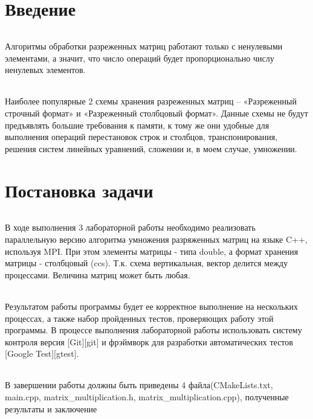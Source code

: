\documentclass[12pt,a4paper]{article}
\begin{document}
\part*{Введение}
\paragraph{}Алгоритмы обработки разреженных матриц работают только с ненулевыми элементами, а значит, что число операций будет пропорционально числу ненулевых элементов.
\paragraph{}Наиболее популярные 2 схемы хранения разреженных матриц – «Разреженный строчный формат» и «Разреженный столбцовый формат». Данные схемы не будут предъявлять большие требования к памяти, к тому же они удобные для выполнения операций перестановок строк и столбцов, транспонирования, решения систем линейных уравнений, сложении и, в моем случае, умножении.

\part*{Постановка задачи}
\paragraph{}В ходе выполнения 3 лабораторной работы необходимо реализовать параллельную версию алгоритма умножения разряженных матриц на языке C++, используя MPI. При этом элементы матрицы - типа double, а формат хранения матрицы - столбцовый (ccs). Т.к. схема вертикальная, вектор делится между процессами. Величина матриц может быть любая.
\paragraph{}Результатом работы программы будет ее корректное выполнение на нескольких процессах, а также набор пройденных тестов, проверяющих работу этой программы. В процессе выполнения лабораторной работы использовать систему контроля версия [Git][git] и фрэймворк для разработки автоматических тестов [Google Test][gtest].
\paragraph{}В завершении работы должны быть приведены 4 файла(CMakeLists.txt, main.cpp, matrix\_multiplication.h, matrix\_multiplication.cpp), полученные результаты и заключение
\end{document}
